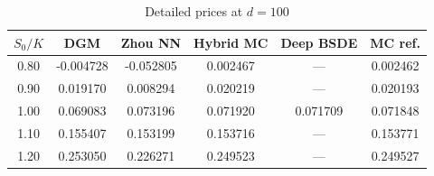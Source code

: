 \documentclass[12pt, a4paper]{article}
\begin{document}
\begin{table}[htpb]
    \centering
    \caption{Detailed prices at $d=100$}
    \label{tab:prices_d100}
    \begin{tabular}{|c|c|c|c|c|c|}
        \hline
        $S_0/K$ & DGM & Zhou NN & Hybrid MC & Deep BSDE & MC ref. \\
        \hline
        0.80 & -0.004728 & -0.052805 & 0.002467 & --- & 0.002462 \\
        0.90 & 0.019170 & 0.008294 & 0.020219 & --- & 0.020193 \\
        1.00 & 0.069083 & 0.073196 & 0.071920 & 0.071709 & 0.071848 \\
        1.10 & 0.155407 & 0.153199 & 0.153716 & --- & 0.153771 \\
        1.20 & 0.253050 & 0.226271 & 0.249523 & --- & 0.249527 \\
        \hline
    \end{tabular}
\end{table}
\end{document}
